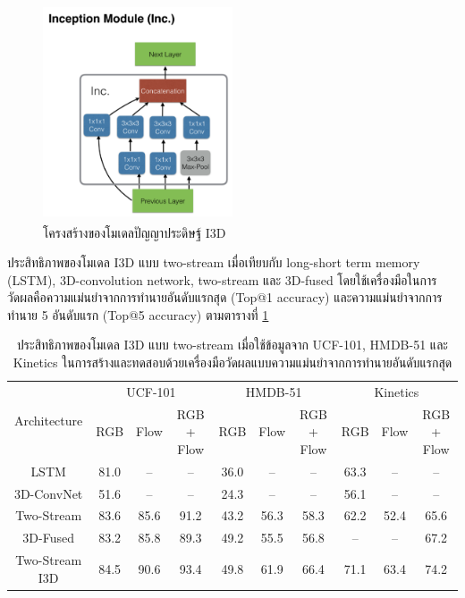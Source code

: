 \begin{figure}[!ht]
    \centering
    \includegraphics[width=0.5\textwidth]{chapter2/images/inceptionModule.png}
    \caption{โครงสร้างของโมเดลปัญญาประดิษฐ์ I3D\textsuperscript{\cite{I3D}}}
    \label{fig:InceptionModule}
\end{figure}
ประสิทธิภาพของโมเดล I3D แบบ two-stream เมื่อเทียบกับ long-short term memory (LSTM),
3D-convolution network, two-stream และ 3D-fused โดยใช้เครื่องมือในการวัดผลคือความแม่นยำจากการทำนายอันดับแรกสุด (Top@1 accuracy) 
และความแม่นยำจากการทำนาย 5 อันดับแรก (Top@5 accuracy) ตามตารางที่ \ref{tab:I3DPerformance}
\begin{table}[ht]
    \begin{tabular}{|*{10}{c|}}
        \hline
        \multirow{2}{*}{Architecture} & \multicolumn{3}{c|}{UCF-101} & \multicolumn{3}{c|}{HMDB-51} & \multicolumn{3}{c|}{Kinetics}\\
        \cline{2-10}
            & RGB & Flow & RGB + Flow & RGB & Flow & RGB + Flow & RGB & Flow & RGB + Flow\\
        \hline\hline
        LSTM            & 81.0 & – & – & 36.0 & – & – & 63.3 & – & –\\
        3D-ConvNet      & 51.6 & – & – & 24.3 & – & – & 56.1 & – & –\\
        Two-Stream      & 83.6 & 85.6 & 91.2 & 43.2 & 56.3 & 58.3 & 62.2 & 52.4 & 65.6\\
        3D-Fused        & 83.2 & 85.8 & 89.3 & 49.2 & 55.5 & 56.8 & – & – & 67.2\\
        Two-Stream I3D  & 84.5 & 90.6 & 93.4 & 49.8 & 61.9 & 66.4 & 71.1 & 63.4 & 74.2\\
        \hline
    \end{tabular}
    \caption{ประสิทธิภาพของโมเดล I3D แบบ two-stream เมื่อใช้ข้อมูลจาก UCF-101, HMDB-51 และ Kinetics ในการสร้างและทดสอบด้วยเครื่องมือวัดผลแบบความแม่นยำจากการทำนายอันดับแรกสุด}
    \label{tab:I3DPerformance}
\end{table}